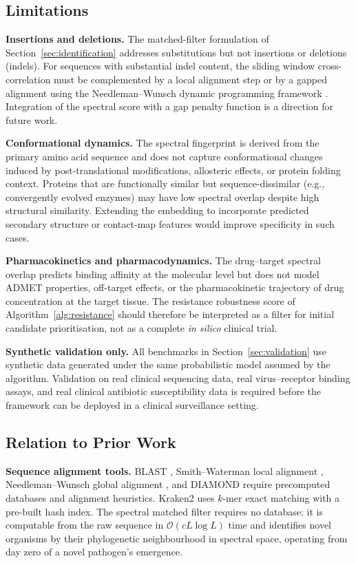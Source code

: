 \documentclass[twocolumn,11pt,a4paper]{article}
\theoremstyle{definition}
\theoremstyle{remark}
\newcommand{\bigO}{\mathcal{O}}
\begin{document}
\subsection{Limitations}

\noindent\textbf{Insertions and deletions.} The matched-filter formulation of
Section~\ref{sec:identification} addresses substitutions but not insertions or
deletions (indels). For sequences with substantial indel content, the sliding
window cross-correlation must be complemented by a local alignment step
\citep{smith1981} or by a gapped alignment using the Needleman--Wunsch dynamic
programming framework \citep{needleman1970}. Integration of the spectral score
with a gap penalty function is a direction for future work.

\noindent\textbf{Conformational dynamics.} The spectral fingerprint is derived
from the primary amino acid sequence and does not capture conformational changes
induced by post-translational modifications, allosteric effects, or protein
folding context. Proteins that are functionally similar but sequence-dissimilar
(e.g., convergently evolved enzymes) may have low spectral overlap despite high
structural similarity. Extending the embedding to incorporate predicted secondary
structure or contact-map features would improve specificity in such cases.

\noindent\textbf{Pharmacokinetics and pharmacodynamics.} The drug--target
spectral overlap predicts binding affinity at the molecular level but does not
model ADMET properties, off-target effects, or the pharmacokinetic trajectory of
drug concentration at the target tissue. The resistance robustness score of
Algorithm~\ref{alg:resistance} should therefore be interpreted as a filter for
initial candidate prioritisation, not as a complete \textit{in silico} clinical
trial.

\noindent\textbf{Synthetic validation only.} All benchmarks in
Section~\ref{sec:validation} use synthetic data generated under the same
probabilistic model assumed by the algorithm. Validation on real clinical
sequencing data, real virus--receptor binding assays, and real clinical
antibiotic susceptibility data is required before the framework can be deployed
in a clinical surveillance setting.

\subsection{Relation to Prior Work}

\noindent\textbf{Sequence alignment tools.} BLAST \citep{altschul1990,
altschul1997}, Smith--Waterman local alignment \citep{smith1981},
Needleman--Wunsch global alignment \citep{needleman1970}, and DIAMOND
\citep{buchfink2015} require precomputed databases and alignment heuristics.
Kraken2 \citep{wood2019} uses $k$-mer exact matching with a pre-built hash
index. The spectral matched filter requires no database: it is computable from
the raw sequence in $\bigO(cL\log L)$ time and identifies novel organisms by
their phylogenetic neighbourhood in spectral space, operating from day zero of
a novel pathogen's emergence.
\end{document}
